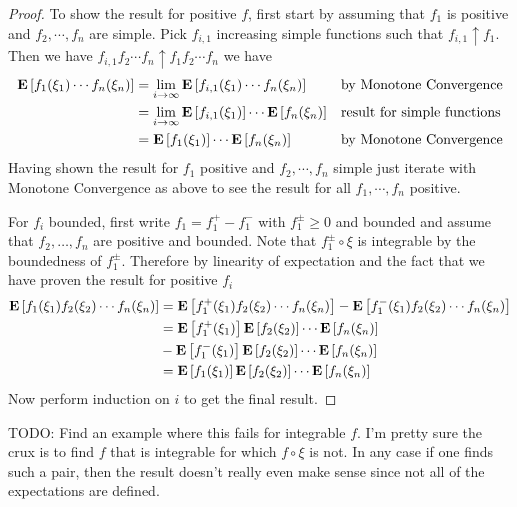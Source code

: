 \begin{proof}
To show the result for positive $f$, first start by assuming that
$f_1$ is positive and $f_2, \cdots, f_n$ are simple.  Pick $f_{i,1}$
increasing simple functions such that $f_{i,1} \uparrow f_1$.  Then we
have $f_{i,1} f_2 \cdots f_n \uparrow f_1 f_2 \cdots f_n$ we have
\begin{align*}
\textbf{E}\left[f_1(\xi_1) \cdots f_n(\xi_n)\right] &= \lim_{i\to
  \infty}\textbf{E}\left[f_{i,1}(\xi_1) \cdots f_n(\xi_n)\right] & & \text{by
  Monotone Convergence} \\
&=\lim_{i\to
  \infty}\textbf{E}\left[f_{i,1}(\xi_1)\right] \cdots \textbf{E}\left[f_n(\xi_n)\right]
& & \text{result for simple functions} \\
&=\textbf{E}\left[f_1(\xi_1)\right] \cdots \textbf{E}\left[f_n(\xi_n)\right] & &\text{by
  Monotone Convergence}
\end{align*}
Having shown the result for $f_1$ positive and $f_2, \cdots, f_n$
simple just iterate with Monotone Convergence as above to see the result for all
$f_1, \cdots, f_n$ positive.

For $f_i$ bounded, first write $f_1 = f_1^+ - f_1^-$ with $f_1^\pm
\geq 0$ and bounded and assume that $f_2, \dots, f_n$ are positive and
bounded.  Note that
$f_1^\pm \circ \xi$ is integrable by the boundedness of $f_1^\pm$.
Therefore by linearity of expectation and the fact that we have proven
the result for positive $f_i$
\begin{align*}
\textbf{E}\left[f_1(\xi_1) f_2(\xi_2) \cdots f_n(\xi_n)\right] &=
\textbf{E}\left[f_1^+(\xi_1) f_2(\xi_2) \cdots f_n(\xi_n)\right] -
\textbf{E}\left[f_1^-(\xi_1) f_2(\xi_2) \cdots f_n(\xi_n)\right] \\
&=\textbf{E}\left[f_1^+(\xi_1)\right]\textbf{E}\left[f_2(\xi_2)\right] \cdots
\textbf{E}\left[f_n(\xi_n)\right] \\ 
&-\textbf{E}\left[f_1^-(\xi_1)\right]\textbf{E}\left[f_2(\xi_2)\right] \cdots
\textbf{E}\left[f_n(\xi_n)\right] \\
&=\textbf{E}\left[f_1(\xi_1)\right]\textbf{E}\left[f_2(\xi_2)\right] \cdots
\textbf{E}\left[f_n(\xi_n)\right] 
\end{align*}
Now perform induction on $i$ to get the final result.
\end{proof}

\begin{examp} TODO:  Find an example where this fails for integrable
  $f$.  I'm pretty sure the crux is to find $f$ that is integrable for which $f \circ
  \xi$ is not.  In any case if one finds such a pair, then the result
  doesn't really even make sense since not all of the expectations are defined.
\end{examp}

